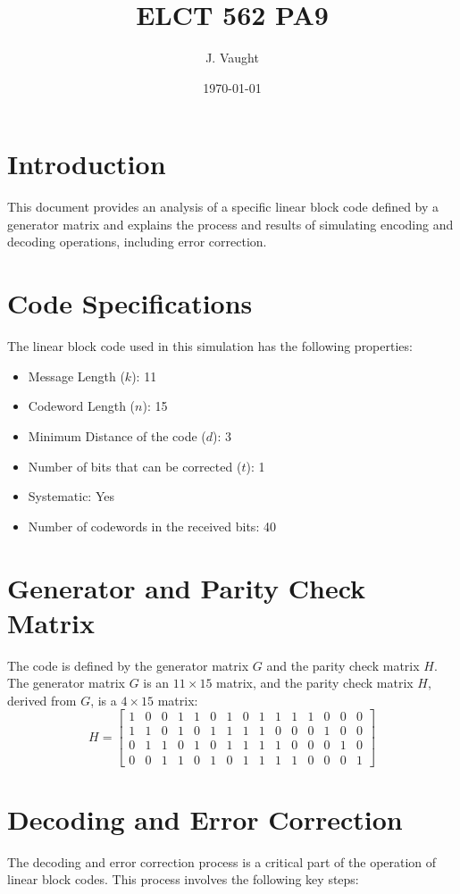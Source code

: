 \documentclass{article}
\title{ELCT 562 PA9}
\author{J. Vaught}
\date{\today}
\begin{document}
\maketitle

\section{Introduction}
This document provides an analysis of a specific linear block code defined by a generator matrix and explains the process and results of simulating encoding and decoding operations, including error correction.

\section{Code Specifications}
The linear block code used in this simulation has the following properties:
\begin{itemize}
    \item Message Length ($k$): 11
    \item Codeword Length ($n$): 15
    \item Minimum Distance of the code ($d$): 3
    \item Number of bits that can be corrected ($t$): 1
    \item Systematic: Yes
    \item Number of codewords in the received bits: 40
\end{itemize}

\section{Generator and Parity Check Matrix}
The code is defined by the generator matrix $G$ and the parity check matrix $H$. The generator matrix $G$ is an $11 \times 15$ matrix, and the parity check matrix $H$, derived from $G$, is a $4 \times 15$ matrix:
\[
H = \left[ \begin{array}{ccccccccccccccc}
    1 & 0 & 0 & 1 & 1 & 0 & 1 & 0 & 1 & 1 & 1 & 1 & 0 & 0 & 0 \\
    1 & 1 & 0 & 1 & 0 & 1 & 1 & 1 & 1 & 0 & 0 & 0 & 1 & 0 & 0 \\
    0 & 1 & 1 & 0 & 1 & 0 & 1 & 1 & 1 & 1 & 0 & 0 & 0 & 1 & 0 \\
    0 & 0 & 1 & 1 & 0 & 1 & 0 & 1 & 1 & 1 & 1 & 0 & 0 & 0 & 1
\end{array} \right]
\]

\section{Decoding and Error Correction}
The decoding and error correction process is a critical part of the operation of linear block codes. This process involves the following key steps:
\end{document}
